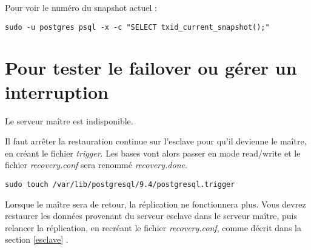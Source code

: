 Pour voir le numéro du snapshot actuel :
\begin{lstlisting}
sudo -u postgres psql -x -c "SELECT txid_current_snapshot();"
\end{lstlisting}


\section{Pour tester le failover ou gérer un interruption}

Le serveur maître est indisponible.

Il faut arrêter la restauration continue sur l'esclave pour qu'il devienne le maître, en créant le fichier \textit{trigger}. Les bases vont alors passer en mode read/write et le fichier \textit{recovery.conf} sera renommé \textit{recovery.done}.
\begin{lstlisting}
sudo touch /var/lib/postgresql/9.4/postgresql.trigger
\end{lstlisting}

Lorsque le maître sera de retour, la réplication ne fonctionnera plus. Vous devrez restaurer les données provenant du serveur esclave dans le serveur maître, puis relancer la réplication, en recréant le fichier \textit{recovery.conf}, comme décrit dans la section \ref{esclave} \textit{}.

